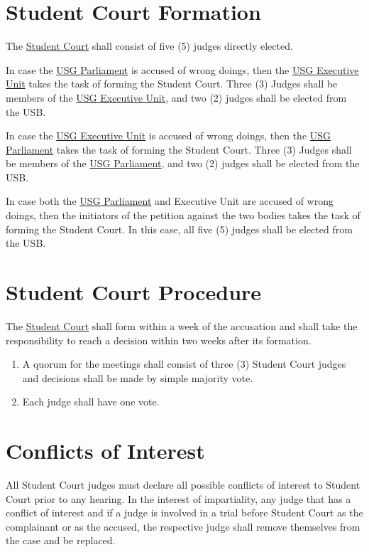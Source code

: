 {\protect\section{Student Court Formation}
The \protect\hyperref[StudentCourtDef]{Student Court} shall consist of five (5) judges directly elected.
\protect\begin{parenum}
	\item In case the \hyperref[USGParliamentDef]{USG Parliament} is accused of wrong doings, then the \hyperref[USGexecutiveUnitDef]{USG Executive Unit} takes the task of forming the Student Court. Three (3) Judges shall be members of the \hyperref[USGexecutiveUnitDef]{USG Executive Unit}, and two (2) judges shall be elected from the USB.
	\item In case the \hyperref[USGexecutiveUnitDef]{USG Executive Unit} is accused of wrong doings, then the \hyperref[USGParliamentDef]{USG Parliament} takes the task of forming the Student Court. Three (3) Judges shall be members of the \hyperref[USGParliamentDef]{USG Parliament}, and two (2) judges shall be elected from the USB.
	\item In case both the \hyperref[USGParliamentDef]{USG Parliament} and Executive Unit are accused of wrong doings, then the initiators of the petition against the two bodies takes the task of forming the Student Court. In this case, all five (5) judges shall be elected from the USB.
\end{parenum}



\protect\section{Student Court Procedure}
The \protect\hyperref[StudentCourtDef]{Student Court} shall form within a week of the accusation and shall take the responsibility to reach a decision within two weeks after its formation. 
\protect\begin{enumerate}[label={\textbf{\S\arabic*}}]
	\item A quorum for the meetings shall consist of three (3) Student Court judges and decisions shall be made by simple majority vote.
	\item Each judge shall have one vote.
\end{enumerate}


\protect\section{Conflicts of Interest}
All Student Court judges must declare all possible conflicts of interest to Student Court prior to any hearing. In the interest of impartiality, any judge that has a conflict of interest and  if a judge is involved in a trial before Student Court as the complainant or as the accused, the respective judge shall remove themselves from the case and be replaced.
}